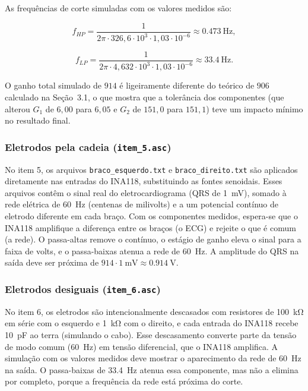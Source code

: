 \documentclass[11pt,a4paper]{article}
\begin{document}
As frequências de corte simuladas com os valores medidos são:

\begin{equation}
f_{HP} = \frac{1}{2\pi \cdot 326{,}6 \cdot 10^3 \cdot 1{,}03 \cdot 10^{-6}} \approx \SI{0,473}{\hertz} ,
\label{eq:fhp_cadeia_montagem}
\end{equation}

\begin{equation}
f_{LP} = \frac{1}{2\pi \cdot 4{,}632 \cdot 10^3 \cdot 1{,}03 \cdot 10^{-6}} \approx \SI{33,4}{\hertz} .
\label{eq:flp_cadeia_montagem}
\end{equation}

O ganho total simulado de $914$ é ligeiramente diferente do teórico de $906$ calculado na Seção~3.1, o que mostra que a tolerância dos componentes (que alterou $G_1$ de $6,00$ para $6,05$ e $G_2$ de $151,0$ para $151,1$) teve um impacto mínimo no resultado final.

\subsubsection{Eletrodos pela cadeia (\texttt{item\_5.asc})}

No item 5, os arquivos \texttt{braco\_esquerdo.txt} e \texttt{braco\_direito.txt} são aplicados diretamente nas entradas do INA118, substituindo as fontes senoidais. Esses arquivos contêm o sinal real do eletrocardiograma (QRS de \SI{1}{\milli\volt}), somado à rede elétrica de \SI{60}{\hertz} (centenas de milivolts) e a um potencial contínuo de eletrodo diferente em cada braço. Com os componentes medidos, espera-se que o INA118 amplifique a diferença entre os braços (o ECG) e rejeite o que é comum (a rede). O passa-altas remove o contínuo, o estágio de ganho eleva o sinal para a faixa de volts, e o passa-baixas atenua a rede de \SI{60}{\hertz}. A amplitude do QRS na saída deve ser próxima de $914 \cdot \SI{1}{\milli\volt} \approx \SI{0,914}{\volt}$.

\subsubsection{Eletrodos desiguais (\texttt{item\_6.asc})}

No item 6, os eletrodos são intencionalmente descasados com resistores de \SI{100}{\kilo\ohm} em série com o esquerdo e \SI{1}{\kilo\ohm} com o direito, e cada entrada do INA118 recebe \SI{10}{\pico\farad} ao terra (simulando o cabo). Esse descasamento converte parte da tensão de modo comum (\SI{60}{\hertz}) em tensão diferencial, que o INA118 amplifica. A simulação com os valores medidos deve mostrar o aparecimento da rede de \SI{60}{\hertz} na saída. O passa-baixas de \SI{33,4}{\hertz} atenua essa componente, mas não a elimina por completo, porque a frequência da rede está próxima do corte.
\end{document}
